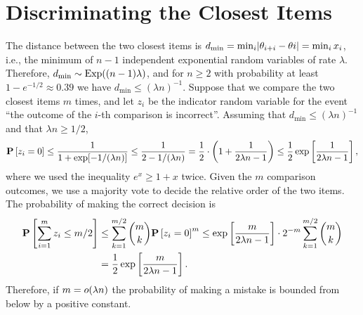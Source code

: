 \section{Discriminating the Closest Items}  %
\label{rs:app:adjacent}


The distance between the two closest items is $d_{\min} = \min_i \lvert \theta_{i+i} - \theta{i} \rvert = \min_i x_i$, i.e., the minimum of $n-1$ independent exponential random variables of rate $\lambda$.
Therefore, $d_{\min} \sim \mathrm{Exp}( (n-1)\lambda )$, and for $n \ge 2$ with probability at least $1 - e^{-1/2} \approx 0.39$ we have $d_{\min} \le (\lambda n)^{-1}$.
Suppose that we compare the two closest items $m$ times, and let $z_i$ be the indicator random variable for the event ``the outcome of the $i$-th comparison is incorrect''.
Assuming that $d_{\min} \le (\lambda n)^{-1}$ and that $\lambda n \ge 1/2$,
\begin{align*}
\mathbf{P}\left[ z_i = 0 \right]
    \le \frac{1}{1 + \exp[-1 / (\lambda n)]} \le \frac{1}{2 - 1/(\lambda n)}
    = \frac{1}{2} \cdot \left( 1 + \frac{1}{2\lambda n - 1} \right)
    \le \frac{1}{2} \exp \left[ \frac{1}{2\lambda n - 1} \right],
\end{align*}
where we used the inequality $e^{x} \ge 1 + x$ twice.
Given the $m$ comparison outcomes, we use a majority vote to decide the relative order of the two items.
The probability of making the correct decision is
\begin{align*}
\mathbf{P}\left[ \sum_{i = 1}^m z_i \le m/2 \right]
    &\le \sum_{k = 1}^{m/2} \binom{m}{k} \mathbf{P}\left[ z_i = 0 \right]^m
     \le \exp \left[ \frac{m}{2\lambda n - 1} \right] \cdot 2^{-m} \sum_{k = 1}^{m/2} \binom{m}{k} \\
    &= \frac{1}{2} \exp \left[ \frac{m}{2\lambda n - 1} \right].
\end{align*}
Therefore, if $m = o(\lambda n)$ the probability of making a mistake is bounded from below by a positive constant.
